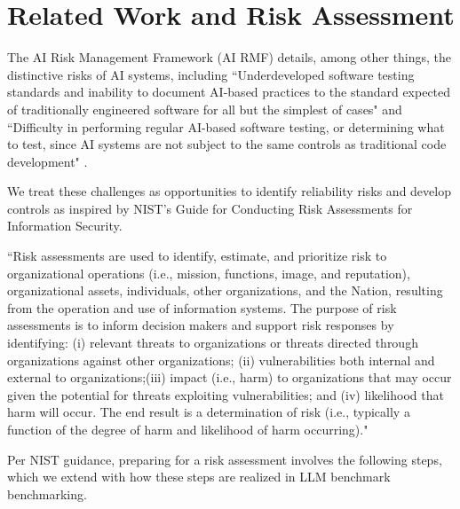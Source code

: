 \documentclass{article}
\begin{document}
\section{Related Work and Risk Assessment}
The AI Risk Management Framework (AI RMF) details, among other things, the distinctive risks of AI systems, including ``Underdeveloped software testing standards and inability to document AI-based practices to the standard expected of traditionally engineered software for all but the simplest of cases" and ``Difficulty in performing regular AI-based software testing, or determining what to test, since AI systems are not subject to the same controls as traditional code development" \cite{nistAI_RMF}.

We treat these challenges as opportunities to identify reliability risks and develop controls
as inspired by NIST's Guide for Conducting Risk Assessments for Information Security.

\begin{center}
    \begin{tcolorbox}[colback=gray!10, colframe=black!50, width=\textwidth, boxrule=0.5mm, sharp corners, coltext=black]
``Risk assessments are used to identify, estimate, and prioritize risk to organizational operations (i.e., mission, functions, image, and reputation), organizational assets, individuals, other organizations, and the Nation, resulting from the operation and use of information systems. The purpose of risk assessments is to inform decision makers and support risk responses by identifying: (i) relevant threats to organizations or threats directed through organizations against other organizations; (ii) vulnerabilities both internal and external to organizations;(iii) impact (i.e., harm) to organizations that may occur given the potential for threats exploiting vulnerabilities; and (iv) likelihood that harm will occur. The end result is a determination of risk (i.e., typically a function of the degree of harm and likelihood of harm occurring)."\cite{nist80030r1}
    \end{tcolorbox}
\end{center}

Per NIST guidance, preparing for a risk assessment involves the following steps, which we extend with how these steps are realized in LLM benchmark benchmarking.
\end{document}
